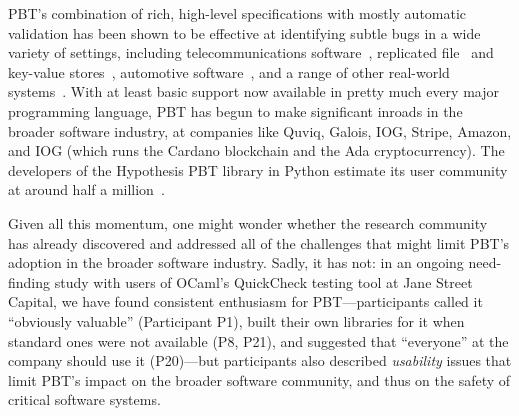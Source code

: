 PBT's combination of rich, high-level specifications with mostly
automatic validation has been shown to be effective at identifying subtle
bugs in a wide variety of settings, including telecommunications
software~\cite{arts2006testing}, replicated
file~\cite{MysteriesOfDropbox2016} and key-value
stores~\cite{Bornholt2021}, automotive software~\cite{arts2015testing}, and a range
of other real-world systems~\cite{hughes2016experiences}. With at
least basic support
now available in pretty much every major programming language\iflater {}\fi, PBT has
begun to make significant inroads in the broader software
industry, at companies like Quviq, Galois, IOG, Stripe,
Amazon, and IOG  (which runs the Cardano blockchain and the Ada
cryptocurrency).  The developers of the Hypothesis PBT library in
Python estimate its user community at around half a
million~\cite{ZacPersonalCommunication}.  \iflater{}\fi


\newcommand{\participant}[1]{{P#1}}

Given all this momentum, one might wonder whether the research community
has already discovered and addressed all of the challenges that might limit PBT's adoption
in the broader software industry.  Sadly, it has not:
in an ongoing need-finding study with users of OCaml's QuickCheck testing tool
at Jane Street Capital, we have found
consistent enthusiasm for PBT---participants called it
``obviously valuable'' (Participant \participant{1}),
built their own libraries for it when standard ones were not available
(\participant{8},
\participant{21}), and suggested that ``everyone'' at the company should use it
(\participant{20})---but participants also described {\em usability} issues that
limit PBT's impact on the broader software community, and thus on the safety of
critical software systems.

